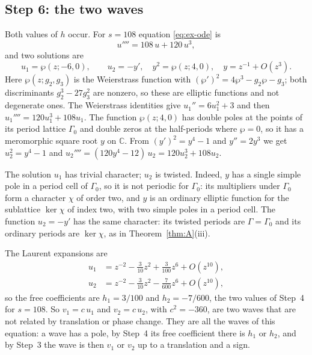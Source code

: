 \documentclass[11pt]{article}
\theoremstyle{definition}
\theoremstyle{remark}
\numberwithin{equation}{section}
\newcommand{\CC}{\mathbb C}
\begin{document}
\subsection{Step 6: the two waves}\label{sec:two-waves}

Both values of \(h\) occur. For \(s=108\) equation \eqref{eq:ex-ode}
is
\begin{equation}\label{eq:two-wave-ode}
 u''''=108\,u+120\,u^3 ,
\end{equation}
and two solutions are
\begin{equation}\label{eq:two-waves}
 u_1=\wp(z;-6,0),\qquad
 u_2=-y',\quad y^2=\wp(z;4,0),\quad y=z^{-1}+O(z^3).
\end{equation}
Here \(\wp(z;g_2,g_3)\) is the Weierstrass function with
\((\wp')^2=4\wp^3-g_2\wp-g_3\); both discriminants \(g_2^3-27g_3^2\)
are nonzero, so these are elliptic functions and not degenerate ones.
The Weierstrass identities give \(u_1''=6u_1^2+3\) and then
\(u_1''''=120u_1^3+108u_1\). The function \(\wp(z;4,0)\) has double
poles at the points of its period lattice \(\Gamma_0\) and double
zeros at the half-periods where \(\wp=0\), so it has a meromorphic
square root \(y\) on \(\CC\). From \((y')^2=y^4-1\) and \(y''=2y^3\)
we get \(u_2^2=y^4-1\) and
\(u_2''''=(120y^4-12)\,u_2=120u_2^3+108u_2\).

The solution \(u_1\) has trivial character; \(u_2\) is twisted. Indeed,
\(y\) has a single simple pole in a period cell of \(\Gamma_0\), so it
is not periodic for \(\Gamma_0\): its multipliers under \(\Gamma_0\)
form a character \(\chi\) of order two, and \(y\) is an ordinary
elliptic function for the sublattice \(\ker\chi\) of index two, with
two simple poles in a period cell. The function \(u_2=-y'\) has the same
character: its twisted periods are \(\Gamma=\Gamma_0\) and its
ordinary periods are \(\ker\chi\), as in Theorem~\ref{thm:A}(iii).

The Laurent expansions are
\begin{equation}\label{eq:two-wave-jets}
\begin{aligned}
 u_1&=z^{-2}-\tfrac{3}{10}z^2+\tfrac{3}{100}z^6+O(z^{10}),\\
 u_2&=z^{-2}-\tfrac{3}{10}z^2-\tfrac{7}{600}z^6+O(z^{10}),
\end{aligned}
\end{equation}
so the free coefficients are \(h_1=3/100\) and \(h_2=-7/600\), the two
values of Step~4 for \(s=108\). So \(v_1=c\,u_1\) and \(v_2=c\,u_2\),
with \(c^2=-360\), are two waves that are not related by translation or
phase change. They are all the waves of this equation: a wave has a
pole, by Step~4 its free coefficient there is \(h_1\) or \(h_2\), and
by Step~3 the wave is then \(v_1\) or \(v_2\) up to a translation and a
sign.
\end{document}
